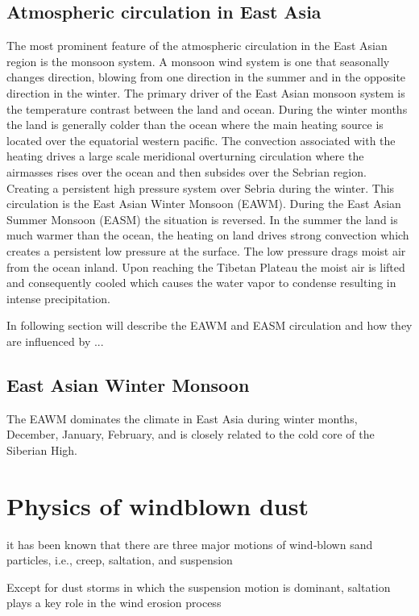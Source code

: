\subsection{Atmospheric circulation in East Asia}
The most prominent feature of the atmospheric circulation in the East Asian region is the monsoon system. A monsoon wind system is one that seasonally changes direction, blowing from one direction in the summer and in the opposite direction in the winter.  The primary driver of the East Asian monsoon system is the temperature contrast between the land and ocean. During the winter months the land is generally colder than the ocean where the main heating source is located over the equatorial western pacific. The convection associated with the heating drives a large scale meridional overturning circulation where the airmasses rises over the ocean and then subsides over the Sebrian region. Creating a persistent high pressure system over Sebria during the winter. This circulation is the East Asian Winter Monsoon (EAWM). During the East Asian Summer Monsoon (EASM) the situation is reversed. In the summer the land is much warmer than the ocean, the heating on land drives strong convection which creates a persistent low pressure at the surface. The low pressure drags moist air from the ocean inland. Upon reaching the Tibetan Plateau the moist air is lifted and consequently cooled which causes the water vapor to condense resulting in intense precipitation. 

In following section will describe the EAWM and EASM circulation and how they are influenced by ...   

\subsection{East Asian Winter Monsoon}
The EAWM dominates the climate in East Asia during winter months, December, January, February, and is closely related to the cold core of the Siberian High.  

\section{Physics of windblown dust}
it has been known that there are three major motions of wind‐blown sand particles, i.e., creep, saltation, and suspension

Except for dust storms in which the suspension motion is dominant, saltation plays a key role in the wind erosion process
